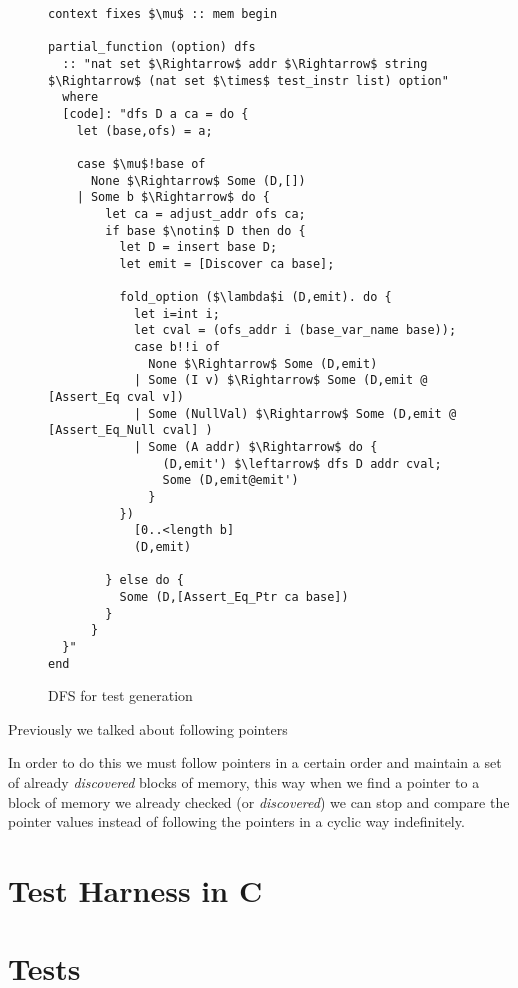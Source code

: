 \begin{figure}
\begin{lstlisting}[mathescape=true]
context fixes $\mu$ :: mem begin  

partial_function (option) dfs 
  :: "nat set $\Rightarrow$ addr $\Rightarrow$ string $\Rightarrow$ (nat set $\times$ test_instr list) option"
  where
  [code]: "dfs D a ca = do {
    let (base,ofs) = a;

    case $\mu$!base of
      None $\Rightarrow$ Some (D,[])
    | Some b $\Rightarrow$ do {  
        let ca = adjust_addr ofs ca;
        if base $\notin$ D then do {
          let D = insert base D;
          let emit = [Discover ca base];
            
          fold_option ($\lambda$i (D,emit). do {
            let i=int i;
            let cval = (ofs_addr i (base_var_name base));
            case b!!i of
              None $\Rightarrow$ Some (D,emit)
            | Some (I v) $\Rightarrow$ Some (D,emit @ [Assert_Eq cval v])
            | Some (NullVal) $\Rightarrow$ Some (D,emit @ [Assert_Eq_Null cval] )
            | Some (A addr) $\Rightarrow$ do {
                (D,emit') $\leftarrow$ dfs D addr cval;
                Some (D,emit@emit')
              }
          })
            [0..<length b]
            (D,emit)

        } else do {
          Some (D,[Assert_Eq_Ptr ca base])
        }
      }    
  }"
end
\end{lstlisting}

\caption{DFS for test generation}
\label{fig:dfs_test}
\end{figure}

Previously we talked about following pointers 

In order to do this we must follow pointers in a certain order and maintain a set of already \textit{discovered} blocks of memory, this way when we find a pointer to a block of memory we already checked (or \textit{discovered}) we can stop and compare the pointer values instead of following the pointers in a cyclic way indefinitely.

\section{Test Harness in C}

\section{Tests}

